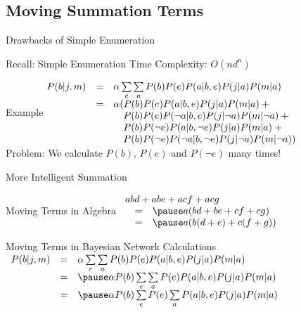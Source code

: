 \documentclass[12pt]{beamer}
\newcommand{\tab}{\hspace{1em}}
\begin{document}
\subsection{Moving Summation Terms}
\begin{frame}{Drawbacks of Simple Enumeration}
	\begin{block}{Recall: Simple Enumeration}
		Time Complexity: $O(nd^{n})$
	\end{block}
	\pause
	\begin{block}{Example}
		$
		\begin{array}{@{}lll@{}}
		P(b|j,m) & = & \alpha\sum\limits_{e}\sum\limits_{a}P(b)P(e)P(a|b,e)P(j|a)P(m|a) \\
		         & = & \alpha(P(b)P(e)P(a|b,e)P(j|a)P(m|a) + \mbox{}\\
		         &   &   \tab P(b)P(e)P(\lnot a|b,e)P(j|\lnot a)P(m|\lnot a) + \mbox{}\\
		         &   &   \tab P(b)P(\lnot e)P(a|b,\lnot e)P(j|a)P(m|a) + \mbox{}\\
		         &   &   \tab P(b)P(\lnot e)P(\lnot a|b,\lnot e)P(j|\lnot a)P(m|\lnot a))
		\end{array}
		$
		\\
		\medskip
		\pause Problem: \pause We calculate $P(b)$, $P(e)$ and $P(\lnot e)$ many times!
	\end{block}
\end{frame}
\begin{frame}{More Intelligent Summation}
	\begin{block}{Moving Terms in Algebra}
		$
		\begin{array}{lll}
		\lefteqn{abd + abe + acf + acg} \\
		   & = & \pause a(bd + be + cf + cg) \\
		   & = & \pause a(b(d + e) + c(f + g)) \\
		\end{array}
		$
	\end{block}
	\pause
	\begin{block}{Moving Terms in Bayesian Network Calculations}
		$
		\begin{array}{lll}
		P(b|j,m) & = & \alpha\sum\limits_{e}\sum\limits_{a}P(b)P(e)P(a|b,e)P(j|a)P(m|a) \\
		         & = & \pause
		               \alpha P(b)\sum\limits_{e}\sum\limits_{a}P(e)P(a|b,e)P(j|a)P(m|a) \\
		         & = & \pause
		               \alpha P(b)\sum\limits_{e}P(e)\sum\limits_{a}P(a|b,e)P(j|a)P(m|a)
		\end{array}
		$
	\end{block}
\end{frame}
\end{document}
